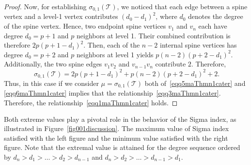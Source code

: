 \documentclass[12pt, a4paper]{article}
\theoremstyle{plain}  %
\theoremstyle{definition}  %
\newcommand{\TT}{\mathcal{T}}
\begin{document}
\begin{proof}
Now, for establishing $\sigma_{0,1}(\TT)$, we noticed that each edge between a spine vertex and a level-1 vertex contributes $(d_0-d_1)^2$, where $d_0$ denotes the degree of the spine vertex. Hence, two endpoint spine vertices $v_1$ and $v_n$ each have degree $d_0 = p+1$ and $p$ neighbors at level 1. Their combined contribution is therefore  
  $2p(p+1-d_1)^2$. Then, each of the $n-2$ internal spine vertices has degree $d_0 = p+2$ and $p$ neighbors at level 1 yields $p(n-2)(p+2-d_1)^2$. Additionally, the two spine edges $v_1v_2$ and $v_{n-1}v_n$ contribute $2$. Therefore,
\begin{equation}~\label{eqq6maThmn1cater}
\sigma_{0,1}(\TT)=2p(p+1-d_1)^2+p(n-2)(p+2-d_1)^2+2.
\end{equation}
Thus, in this case if we consider $\mu=\sigma_{0,1}(\TT)$ both of~\eqref{eqq5maThmn1cater} and \eqref{eqq6maThmn1cater} implies that the relationship~\eqref{eqq3maThmn1cater}. Therefore, the relationship~\eqref{eqq1maThmn1cater} holds. 
\end{proof}
Both extreme values play a pivotal role in the behavior of the Sigma index, as illustrated in Figure~\ref{fig001discussion}. The maximum value of Sigma index satisfied with the left figure and the minimum value satisfied with the right figure. Note that the extremal value is attained for the degree sequence ordered by $d_n>d_1>\dots>d_2>d_{n-1}$ and $d_n>d_2>\dots>d_{n-1}>d_1$.
\end{document}
